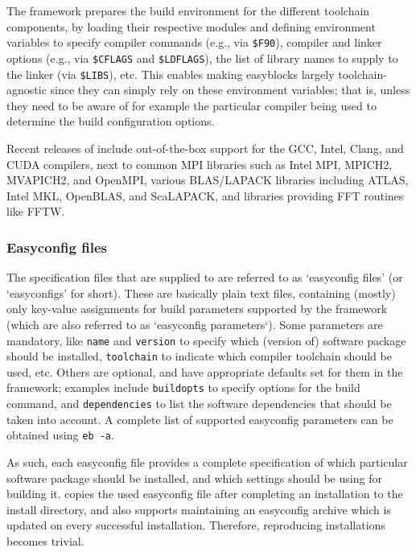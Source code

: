 The \easybuild{} framework prepares the build environment for the different
toolchain components, by loading their respective modules and defining environment
variables to specify compiler commands (e.g., via \texttt{\$F90}), compiler and
linker options (e.g., via \texttt{\$CFLAGS} and \texttt{\$LDFLAGS}), the list of
library names to supply to the linker (via \texttt{\$LIBS}), etc. This enables
making easyblocks largely toolchain-agnostic since they can simply rely on these
environment variables; that is, unless they need to be aware of for example the
particular compiler being used to determine the build configuration options.

Recent releases of \easybuild{} include out-of-the-box support for the GCC, Intel,
Clang, and CUDA compilers, next to common MPI libraries such as Intel MPI, MPICH2,
MVAPICH2, and OpenMPI, various BLAS/LAPACK libraries including ATLAS, Intel MKL,
OpenBLAS, and ScaLAPACK, and libraries providing FFT routines like FFTW.

\subsubsection{Easyconfig files}
\label{sec:eb_easyconfigs}

The specification files that are supplied to \easybuild{} are referred to as
`easyconfig files' (or `easyconfigs' for short). These are basically plain text
files, containing (mostly) only key-value assignments for build parameters supported
by the framework (which are also referred to as `easyconfig parameters`). Some
parameters are mandatory, like \texttt{name} and \texttt{version} to specify which
(version of) software package should be installed, \texttt{toolchain} to indicate
which compiler toolchain should be used, etc. Others are optional, and have
appropriate defaults set for them in the \easybuild{} framework; examples include
\texttt{buildopts} to specify options for the build command, and \texttt{dependencies}
to list the software dependencies that should be taken into account. A complete
list of supported easyconfig parameters can be obtained using \texttt{eb -a}.

As such, each easyconfig file provides a complete specification of which particular
software package should be installed, and which settings should be using for building
it. \easybuild{} copies the used easyconfig file after completing an installation
to the install directory, and also supports maintaining an easyconfig archive which
is updated on every successful installation. Therefore, reproducing installations
becomes trivial.

